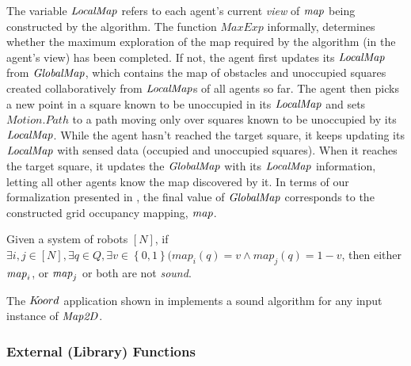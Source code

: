 The variable $\mathit{LocalMap}$ refers to each agent's current \emph{view} of $\mathit{map}$ being constructed by the algorithm. The function $\mathit{MaxExp}$ informally, determines whether the maximum exploration of the map required by the algorithm (in the agent's view) has been completed. If not, the agent first updates its $\mathit{LocalMap}$ from $\mathit{GlobalMap}$, which contains the map of obstacles and unoccupied squares created collaboratively from $\mathit{LocalMap}$s of all agents so far. The agent then picks a new point in a square known to be unoccupied in its $\mathit{LocalMap}$ and sets $\mathit{Motion.Path}$ to a path moving only over squares known to be unoccupied by its $\mathit{LocalMap}$. While the agent hasn't reached the target square, it keeps updating its $\mathit{LocalMap}$ with sensed data (occupied and unoccupied squares). When it reaches the target square, it updates the $\mathit{GlobalMap}$ with its $\mathit{LocalMap}$ information, letting all other agents know the map discovered by it. In terms of our formalization presented in , the final value of $\mathit{GlobalMap}$ corresponds to the constructed grid occupancy mapping, $\mathit{map}$. 


\begin{lemma}
 Given a system of robots $[N]$, if $\exists i , j \in [N], \exists  q \in Q, \exists v \in \left\{0,1\right\} (map_i(q) = v \wedge
 map_j(q) = 1 - v $, then either $\mathit{map}_i$, or $\mathit{map}_j$ or both are not \emph{sound}. 
\end{lemma}


\begin{theorem}
The $K\kern-2pt oord$ application shown in  implements a sound algorithm for any input instance of $\mathit{Map2D}$.
\end{theorem}

\subsubsection{External (Library) Functions}


